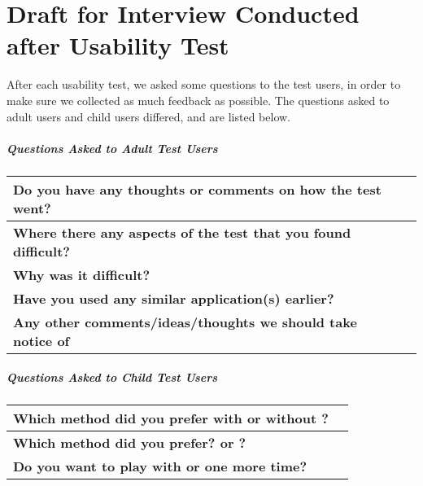 \chapter{Draft for Interview Conducted after Usability Test}
\label{app:interviewafter}

After each usability test, we asked some questions to the test users, in order to make sure we collected as much feedback as possible. The questions asked to adult users and child users differed, and are listed below.

\paragraph{Questions Asked to Adult Test Users}

\begin{center}
	\begin{tabular}{ | p{5.0cm} | p{8.0cm} | }
	\hline
	\textbf{Do you have any thoughts or comments on how the test went?} & \\[5ex]  \hline
	\textbf{Where there any aspects of the test that you found difficult?} & \\[5ex] \hline
	\textbf{Why was it difficult?} & \\[5ex]  \hline
	\textbf{Have you used any similar application(s) earlier?} & \\[5ex] \hline
	\textbf{Any other comments/ideas/thoughts we should take notice of} & \\[5ex] \hline
	\end{tabular}
\end{center}


\paragraph{Questions Asked to Child Test Users}

\begin{center}
	\begin{tabular}{ | p{5.0cm} | p{8.0cm} | }
	\hline
	\textbf{Which method did you prefer with or without \ab{}?} & \\[5ex] \hline
	\textbf{Which method did you prefer? \app{} or \ab{}?} & \\[5ex] \hline
	\textbf{Do you want to play with \app{} or \ab{} one more time?} & \\[5ex] \hline
	\end{tabular}
\end{center}